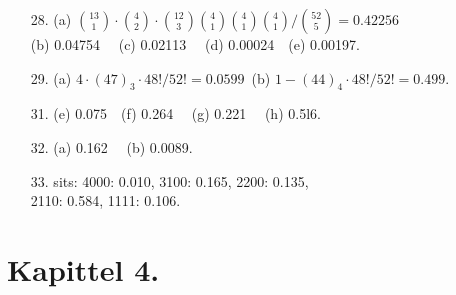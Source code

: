 \begin{itemize}
            (c)   ${36\choose 13}/{52\choose 13} = 0.0036 $\
            (d)  $  {4\choose 1}\cdot {48\choose 12}/{52\choose 13} = 0.44$\\
            (e)  $  {4\choose 2}\cdot {48\choose 11}/{52\choose 13} = 0.21$
\item[28.]  (a)   $  {13\choose 1}\cdot {4\choose 2}\cdot 
                {12\choose 3}{4\choose 1} {4\choose 1} {4\choose 1} /
               {52\choose 5} =  0.42256$\\
              (b)  0.04754 \ \  (c)  0.02113 \ \  (d) 0.00024\ \ (e)  0.00197.
\item[29.]  (a) $ 4\cdot (47)_3 \cdot 48!/52! = 0.0599 $\
            (b) $ 1-(44)_4 \cdot 48!/52!=0.499.$
\item[31.]  (e)  0.075\ \   (f)  0.264 \ \  (g)  0.221 \ \  (h)  0.5l6.
\item[32.]  (a)  0.162  \ \ (b)  0.0089.
\item[33.]  sits:  4000:  0.010,  3100:  0.165,  2200:  0.135,\\
                     2110:  0.584,  1111:  0.106.
\end{itemize}
         
\section*{Kapittel 4.}
         
